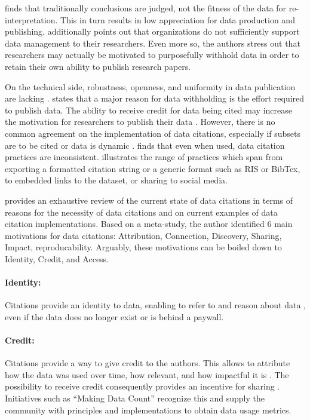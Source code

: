 \documentclass[a4paper,10pt]{article}
\begin{document}
\citep{Lawrence2011} finds that traditionally conclusions are judged, not the fitness of the data for re-interpretation. This in turn results in low appreciation for data production and publishing.
\citep{Tenopir2011} additionally points out that organizations do not sufficiently support data management to their researchers. Even more so, the authors stress out that researchers may actually be motivated to purposefully withhold data in order to retain their own ability to publish research papers.

On the technical side, robustness, openness, and uniformity in data publication are lacking \citep{Starr2015}. \citep{Tenopir2011} states that a major reason for data withholding is the effort required to publish data. 
The ability to receive credit for data being cited may increase the motivation for researchers to publish their data \citep{Crosas2011, AltKin07}. However, there is no common agreement on the implementation of data citations, especially if subsets are to be cited or data is dynamic \citep{Kratz2014, Assante2016}. \citep{Belter2014} finds that even when used, data citation practices are inconsistent. \citep{Assante2016} illustrates the range of practices which span from exporting a formatted citation string or a generic format such as RIS or BibTex, to embedded links to the dataset, or sharing to social media. 

\citep{Silvello2017} provides an exhaustive review of the current state of data citations in terms of reasons for the necessity of data citations and on current examples of data citation implementations. 
Based on a meta-study, the author identified 6 main motivations for data citations: Attribution, Connection, Discovery, Sharing, Impact, reproducability. 
Arguably, these motivations can be boiled down to Identity, Credit, and Access. 

\paragraph{Identity:} Citations provide an identity to data, enabling to refer to and reason about data \citep{Bandrowski2016}, even if the data does no longer exist or is behind a paywall.

\paragraph{Credit:}
Citations provide a way to give credit to the authors. This allows to attribute how the data was used over time, how relevant, and how impactful it is \citep{Honor2016}. The possibility to receive credit consequently provides an incentive for sharing \citep{Niemeyer2016, Callaghan2012, Kratz2014}. Initiatives such as ``Making Data Count''\citep{Kratz2015} recognize this and supply the community with principles and implementations to obtain data usage metrics.
\end{document}
